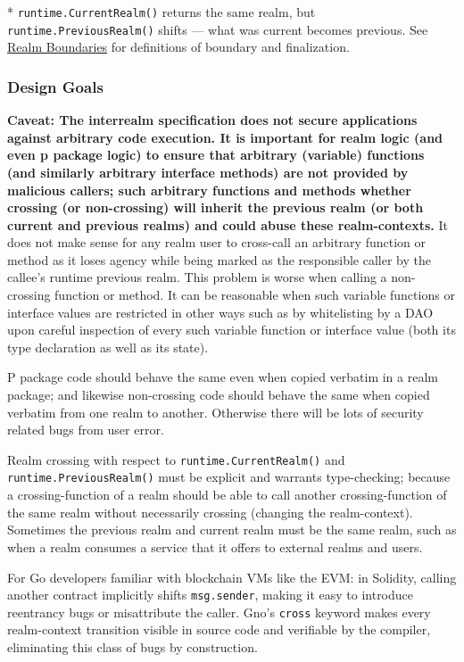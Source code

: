 \documentclass[12pt,a4paper]{article}
\newcommand{\passthrough}[1]{#1}
\begin{document}
* \passthrough{\lstinline!runtime.CurrentRealm()!} returns the same
realm, but \passthrough{\lstinline!runtime.PreviousRealm()!} shifts ---
what was current becomes previous. See \hyperref[realm-boundaries]{Realm
Boundaries} for definitions of boundary and finalization.

\subsubsection{Design Goals}\label{design-goals}

\textbf{Caveat: The interrealm specification does not secure
applications against arbitrary code execution. It is important for realm
logic (and even p package logic) to ensure that arbitrary (variable)
functions (and similarly arbitrary interface methods) are not provided
by malicious callers; such arbitrary functions and methods whether
crossing (or non-crossing) will inherit the previous realm (or both
current and previous realms) and could abuse these realm-contexts.} It
does not make sense for any realm user to cross-call an arbitrary
function or method as it loses agency while being marked as the
responsible caller by the callee's runtime previous realm. This problem
is worse when calling a non-crossing function or method. It can be
reasonable when such variable functions or interface values are
restricted in other ways such as by whitelisting by a DAO upon careful
inspection of every such variable function or interface value (both its
type declaration as well as its state).

P package code should behave the same even when copied verbatim in a
realm package; and likewise non-crossing code should behave the same
when copied verbatim from one realm to another. Otherwise there will be
lots of security related bugs from user error.

Realm crossing with respect to
\passthrough{\lstinline!runtime.CurrentRealm()!} and
\passthrough{\lstinline!runtime.PreviousRealm()!} must be explicit and
warrants type-checking; because a crossing-function of a realm should be
able to call another crossing-function of the same realm without
necessarily crossing (changing the realm-context). Sometimes the
previous realm and current realm must be the same realm, such as when a
realm consumes a service that it offers to external realms and users.

For Go developers familiar with blockchain VMs like the EVM: in
Solidity, calling another contract implicitly shifts
\passthrough{\lstinline!msg.sender!}, making it easy to introduce
reentrancy bugs or misattribute the caller. Gno's
\passthrough{\lstinline!cross!} keyword makes every realm-context
transition visible in source code and verifiable by the compiler,
eliminating this class of bugs by construction.
\end{document}
